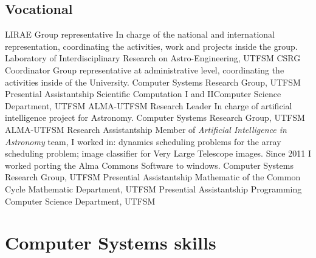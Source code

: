 \documentclass[11pt,a4paper]{moderncv}
\begin{document}
\subsection{Vocational}
	{LIRAE Group representative}
	{In charge of the national and international representation, coordinating the activities, work and projects inside the group.}
	{Laboratory of Interdisciplinary Research on Astro-Engineering, UTFSM}
	{}{}
	{CSRG Coordinator}
	{Group representative at administrative level, coordinating the activities inside of the University.}
	{Computer Systems Research Group, UTFSM}
	{}{}
	{Presential Assistantship}
	{Scientific Computation I and II}{Computer Science Department, UTFSM}
	{}{}
	{ALMA-UTFSM Research Leader}
	{In charge of artificial intelligence project for Astronomy.}
	{Computer Systems Research Group, UTFSM}
	{}{}
	{ALMA-UTFSM Research Assistantship}
	{Member of \emph{Artificial Intelligence in Astronomy} team, I worked in:
	dynamics scheduling problems for the array scheduling problem; image classifier for Very Large Telescope
	images. Since 2011 I worked porting the Alma Commons Software to windows.}
	{Computer Systems Research Group, UTFSM}
	{}{}
	{Presential Assistantship}
	{Mathematic of the Common Cycle}
	{Mathematic Department, UTFSM}
	{}{}
	{Presential Assistantship}
	{Programming}
	{Computer Science Department, UTFSM}
	{}{}

\section{Computer Systems skills}
\end{document}
